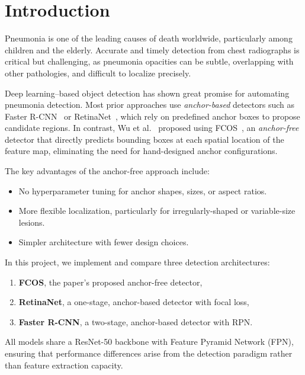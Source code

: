 \documentclass[11pt,a4paper]{article}
\begin{document}
\newpage
\tableofcontents

\pagebreak

\section{Introduction}
\label{sec:intro}

Pneumonia is one of the leading causes of death worldwide, particularly among children and the elderly. Accurate and timely detection from chest radiographs is critical but challenging, as pneumonia opacities can be subtle, overlapping with other pathologies, and difficult to localize precisely.

Deep learning--based object detection has shown great promise for automating pneumonia detection. Most prior approaches use \emph{anchor-based} detectors such as Faster R-CNN~\cite{ren2015faster} or RetinaNet~\cite{lin2017focal}, which rely on predefined anchor boxes to propose candidate regions. In contrast, Wu et al.~\cite{wu2024pneumonia} proposed using FCOS~\cite{tian2019fcos}, an \emph{anchor-free} detector that directly predicts bounding boxes at each spatial location of the feature map, eliminating the need for hand-designed anchor configurations.

The key advantages of the anchor-free approach include:
\begin{itemize}[nosep]
    \item No hyperparameter tuning for anchor shapes, sizes, or aspect ratios.
    \item More flexible localization, particularly for irregularly-shaped or variable-size lesions.
    \item Simpler architecture with fewer design choices.
\end{itemize}

In this project, we implement and compare three detection architectures:
\begin{enumerate}[nosep]
    \item \textbf{FCOS}, the paper's proposed anchor-free detector,
    \item \textbf{RetinaNet}, a one-stage, anchor-based detector with focal loss,
    \item \textbf{Faster R-CNN}, a two-stage, anchor-based detector with RPN.
\end{enumerate}

All models share a ResNet-50 backbone with Feature Pyramid Network (FPN), ensuring that performance differences arise from the detection paradigm rather than feature extraction capacity.
\end{document}
